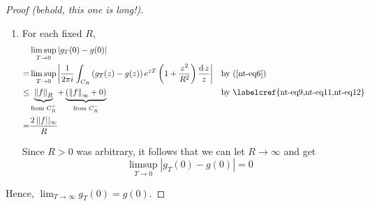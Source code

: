 \documentclass[12pt]{article}
\renewcommand{\d}{\ensuremath{\operatorname{d}}}
\begin{document}
\begin{proof}[Proof (behold, this one is long!)]
\begin{enumerate}[align=left, label=\textit{Step \arabic*:}]
    Fix $\epsilon>0$ and obtain a curve $C_R^{-}(\epsilon)$ by removing, from the beginning and end of $C_R^{-}$, \textcolor{purple}{two arcs each of length $\epsilon \delta_R /(4 M)$}. 
    Then there is a $\rho>0$ such that $\re  z<-\rho$ for each $z \in C_R^{-}(\epsilon)$.
    Consequently,
    $$
    \begin{aligned}
    \limsup _{T \rightarrow \infty}\left|\int_{C_R^{-}} \gt{g(z)} \bt{e^{z T}}\left(\rt{1+\frac{z^2}{R^2}}\right) \frac{d z}{z}\right| & 
    \leq \limsup _{T \rightarrow \infty}
    \Bigg(\underbrace{\textcolor{blue}{\frac{2 M e^{-\rho T}}{\delta_R} \cdot \pi R}}_{\text {from } C_R^{-}(\epsilon)}
    +\underbrace{\frac{\rt{2}\cdot \bt{1}
    \cdot \gt{M}}{\delta_R} 
    \cdot 2\textcolor{purple}{\frac{ \epsilon \delta_R}{4 M}}}_{\text {from the two arcs}}\Bigg) \\
    & =\epsilon 
    \end{aligned}
    $$
    Since $\epsilon>0$ was arbitrary,
    \begin{equation}\label{nt-eq12}
        \limsup _{T \rightarrow \infty}\left|\int_{C_R^{-}} g(z) e^{z T}\left(1+\frac{z^2}{R^2}\right) \frac{d z}{z}\right|=0
    \end{equation}
    \setcounter{enumi}{6}

    \item For each fixed $R$,
    \begin{align*}
        &\limsup_{T\to0}|g_{T}(0)-g(0)|\\
        =&\limsup_{T\to0}\left|\frac{1}{2\pi i}\int_{C_{R}}\left(g_{T}(z)-g(z)\right)e^{zT}\left(1+\frac{z^{2}}{R^{2}}\right)\frac{\d z}{z}\right| &&\text{by (\ref{nt-eq6})}\\
        \leq &\underbrace{\left\|f\right\|_{R}}_{\text{from }C_{R}^{+}}+\underbrace{\left(\left\|f\right\|_{\infty}+0\right)}_{\text{from }C_{R}^{-}} &&\text{by \labelcref{nt-eq9,nt-eq11,nt-eq12}}\\
        =& \frac{2\,||f||_\infty}{R}
    \end{align*} 

Since $R > 0$ was arbitrary, it follows that we can let $R\to \infty$ and get \[\operatorname*{limsup}_{T\rightarrow0}|g_{T}({0}){-}g({0})|{=}{0}\]
\end{enumerate}
Hence, $\operatorname*{lim}_{T\to\infty}g_{T}(0)=g(0)$.
\end{proof}
\end{document}
